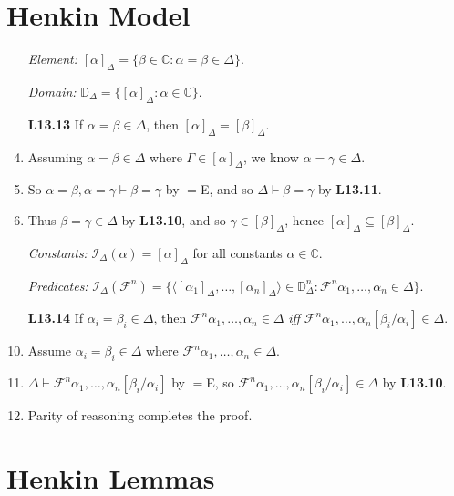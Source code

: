 \documentclass[a4paper, 11pt]{article} %
\def\proves{\ensuremath{\vdash}}
\newcommand{\tuple}[1]{\langle#1\rangle} %
\newcommand{\set}[1]{\lbrace#1\rbrace} %
\newcommand{\I}{\mathcal{I}}
\newcommand{\F}{\mathcal{F}}
\newcommand{\D}{\mathbb{D}}
\newcommand{\C}{\mathbb{C}}
\newcommand{\unisub}[2]{[#1/#2]}
\begin{document}
\section*{Henkin Model}

\begin{enumerate}
  \item[\it Element:] $[\alpha]_\Delta=\set{\beta\in\C:\alpha=\beta\in\Delta}$.
  \item[\it Domain:] $\D_\Delta=\set{[\alpha]_\Delta:\alpha\in\C}$.
  \item[\bf L13.13] If $\alpha=\beta\in\Delta$, then $[\alpha]_\Delta=[\beta]_\Delta$.
  \item Assuming $\alpha=\beta\in\Delta$ where $\Gamma\in[\alpha]_\Delta$, we know $\alpha=\gamma\in\Delta$.
  \item So $\alpha=\beta,\alpha=\gamma\proves\beta=\gamma$ by $=$E, and so $\Delta\proves\beta=\gamma$ by \textbf{L13.11}.
  \item Thus $\beta=\gamma\in\Delta$ by \textbf{L13.10}, and so $\gamma\in[\beta]_\Delta$, hence $[\alpha]_\Delta\subseteq[\beta]_\Delta$.
  \item[\it Constants:] $\I_\Delta(\alpha)=[\alpha]_\Delta$ for all constants $\alpha\in\C$.
  \item[\it Predicates:] $\I_\Delta(\F^n)=\set{\tuple{[\alpha_1]_\Delta,\ldots,[\alpha_n]_\Delta}\in\D_\Delta^n:\F^n\alpha_1,\ldots,\alpha_n\in\Delta}$.
  \item[\bf L13.14] If $\alpha_i=\beta_i\in\Delta$, then $\F^n\alpha_1,\ldots,\alpha_n\in\Delta$ \textit{iff} $\F^n\alpha_1,\ldots,\alpha_n\unisub{\beta_i}{\alpha_i}\in\Delta$.
    \setcounter{enumi}{0}
  \item Assume $\alpha_i=\beta_i\in\Delta$ where $\F^n\alpha_1,\ldots,\alpha_n\in\Delta$.
  \item $\Delta\proves\F^n\alpha_1,\ldots,\alpha_n\unisub{\beta_i}{\alpha_i}$ by $=$E, so $\F^n\alpha_1,\ldots,\alpha_n\unisub{\beta_i}{\alpha_i}\in\Delta$ by \textbf{L13.10}.
  \item Parity of reasoning completes the proof.
\end{enumerate}




\section*{Henkin Lemmas}
\end{document}
